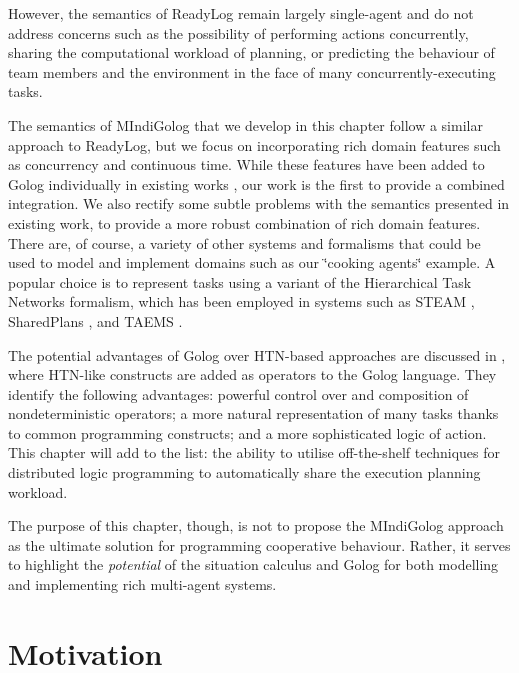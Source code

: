 However, the semantics of ReadyLog remain largely single-agent and
do not address concerns such as the possibility of performing actions
concurrently, sharing the computational workload of planning, or predicting
the behaviour of team members and the environment in the face of many
concurrently-executing tasks.

The semantics of MIndiGolog that we develop in this chapter follow
a similar approach to ReadyLog, but we focus on incorporating rich
domain features such as concurrency and continuous time. While these
features have been added to Golog individually in existing works \citep{Reiter98seq_temp_golog,pinto99tcongolog,pirri00planning_nat_acts,reiter01kia},
our work is the first to provide a combined integration. We also rectify
some subtle problems with the semantics presented in existing work,
to provide a more robust combination of rich domain features.\\


There are, of course, a variety of other systems and formalisms that
could be used to model and implement domains such as our \char`\"{}cooking
agents\char`\"{} example. A popular choice is to represent tasks using
a variant of the Hierarchical Task Networks formalism, which has been
employed in systems such as STEAM \citep{tambe97flexible_teamwork},
SharedPlans \citep{grosz96sharedplans}, and TAEMS \citep{decker95designing_coordination}.

The potential advantages of Golog over HTN-based approaches are discussed
in \citep{son00htn_golog}, where HTN-like constructs are added as
operators to the Golog language. They identify the following advantages:
powerful control over and composition of nondeterministic operators;
a more natural representation of many tasks thanks to common programming
constructs; and a more sophisticated logic of action. This chapter
will add to the list: the ability to utilise off-the-shelf techniques
for distributed logic programming to automatically share the execution
planning workload.

The purpose of this chapter, though, is not to propose the MIndiGolog
approach as the ultimate solution for programming cooperative behaviour.
Rather, it serves to highlight the \emph{potential} of the situation
calculus and Golog for both modelling and implementing rich multi-agent
systems.


\section{Motivation\label{sec:MIndiGolog:Motivation}}

